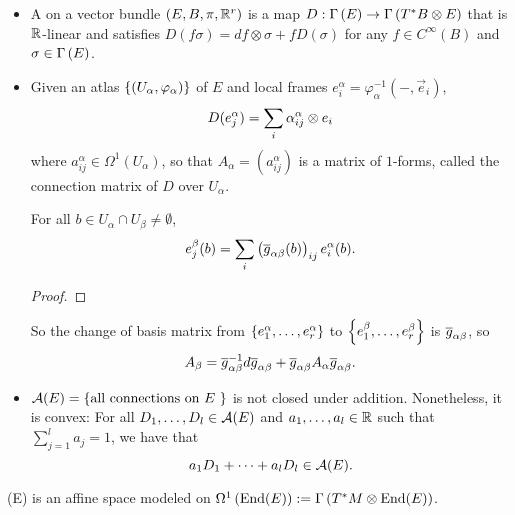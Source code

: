\documentclass[main.tex]{subfiles}
\begin{document}
\begin{itemize}
    \item  A  on a vector bundle $(E, B, \pi, \mathbb{R}^r)$ is a map $D : \Gamma\left( E \right) \to \Gamma\left( T^*B \otimes E \right)$ that is $\mathbb{R}$-linear and satisfies $D(f\sigma) = df \otimes \sigma + fD(\sigma)$ for any $f \in C^\infty(B)$ and $\sigma \in \Gamma\left( E \right)$.

    \item Given an atlas $\left\{ \left( U_\alpha, \varphi_\alpha \right) \right\}$ of $E$ and local frames $e_i^\alpha = \varphi_{\alpha}^{-1}(-, \vec{e}_i)$,
    \[
    D(e_j^\alpha) = \sum_i \alpha_{ij}^\alpha \otimes e_i
    \]
    where $a_{ij}^\alpha \in \Omega^1(U_\alpha)$, so that $A_\alpha = (a_{ij}^\alpha)$ is a matrix of $1$-forms, called the connection matrix of $D$ over $U_\alpha$.

     For all $b \in U_\alpha \cap U_\beta \neq \emptyset$,
\[
e_j^\beta(b) = \sum_i \left( \overline{g}_{\alpha\beta}(b) \right)_{ij}e_i^\alpha(b).
\]

\begin{proof}
\end{proof} So the change of basis matrix from $\left\{e_1^\alpha, \dots, e_r^\alpha\right\}$ to $\left\{ e_1^\beta, \dots, e_r^\beta \right\}$ is $\overline{g}_{\alpha\beta}$, so
\[
A_\beta = \overline{g}_{\alpha\beta}^{-1} d \overline{g}_{\alpha\beta} + \overline{g}_{\alpha\beta} A_\alpha \overline{g}_{\alpha\beta}.
\]

\item $\mathcal{A}(E) = \left\{ \text{all connections on $E$ }\right\}$ is not closed under addition. Nonetheless, it is convex: For all $D_1, \dots, D_l \in \mathcal{A}(E)$ and $a_1, \dots, a_l \in \mathbb{R}$ such that $\sum_{j=1}^l a_j = 1$, we have that
\[
    a_1D_1 + \dots + a_lD_l \in \mathcal{A}(E).
\]
\end{itemize}

\begin{prop}
(E) is an affine space modeled on $\Omega^1\left( \text{End}(E) \right) := \Gamma\left( T^*M \otimes \text{End}(E) \right)$.
\end{prop}
\end{document}
